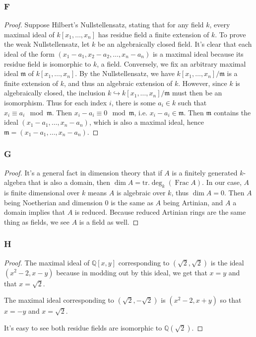 \documentclass{article}
\newcommand{\Q}{\mathbb{Q}}
\newcommand{\frkm}{\mathfrak{m}}
\DeclareMathOperator{\Frac}{\mathrm{Frac}}
\theoremstyle{definition} %
\begin{document}
\subsubsection{F}\label{3.2.F}
\begin{proof}
    Suppose Hilbert's Nullstellensatz, stating that for any field $k$, every maximal ideal of $k[x_1,\dots,x_n]$ has residue field a finite extension of $k$. To prove the weak Nullstellensatz, let $k$ be an algebraically closed field. It's clear that each ideal of the form $(x_1-a_1,x_2-a_2,\dots,x_n-a_n)$ is a maximal ideal because its residue field is isomorphic to $k$, a field. Conversely, we fix an arbitrary maximal ideal $\frkm$ of $k[x_1,\dots,x_n]$. By the Nullstellensatz, we have $k[x_1,\dots,x_n]/\frkm $ is a finite extension of $k$, and thus an algebraic extension of $k$. However, since $k$ is algebraically closed, the inclusion $k\hookrightarrow k[x_1,\dots,x_n]/\frkm$ must then be an isomorphism. Thus for each index $i$, there is some $a_i \in k$ such that $x_i\equiv a_i \mod \frkm$. Then $x_i-a_i \equiv 0 \mod \frkm$, i.e. $x_i-a_i\in \frkm$. Then $\frkm$ contains the ideal $(x_1-a_1,\dots,x_n-a_n)$, which is also a maximal ideal, hence $\frkm=(x_1-a_1,\dots,x_n-a_n)$.
\end{proof}
\subsubsection{G}\label{3.2.G}
\begin{proof}
    It's a general fact in dimension theory that if $A$ is a finitely generated $k$-algebra that is also a domain, then $\dim A = \mathrm{tr}.\deg_k(\Frac A)$. In our case, $A$ is finite dimensional over $k$ means $A$ is algebraic over $k$, thus $\dim A = 0$. Then $A$ being Noetherian and dimension $0$ is the same as $A$ being Artinian, and $A$ a domain implies that $A$ is reduced. Because reduced Artinian rings are the same thing as fields, we see $A$ is a field as well.
\end{proof}
\subsubsection{H}\label{3.2.H}
\begin{proof}
    The maximal ideal of $\Q[x,y]$ corresponding to $(\sqrt{2},\sqrt{2})$ is the ideal $(x^2-2, x-y)$ because in modding out by this ideal, we get that $x=y$ and that $x=\sqrt{2}$.

    The maximal ideal corresponding to $(\sqrt{2},-\sqrt{2})$ is $(x^2-2,x+y)$ so that $x=-y$ and $x=\sqrt{2}$.
    
    It's easy to see both residue fields are isomorphic to $ \Q(\sqrt{2})$.
\end{proof}
\end{document}
